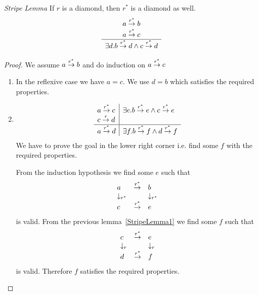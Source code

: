 \begin{lemma}
    \label{StripeLemma2}
    \emph{Stripe Lemma} If $r$ is a diamond, then $r^*$ is a diamond as well.
    $$
    \begin{array}{c} 
        a \stackrel{r^*}{\to} b
        \\
        a \stackrel{r^*}{\to} c
     \\ \hline 
        \exists d. b \stackrel{r^*}{\to} d \land c \stackrel{r^*}{\to} d
    \end{array}
    $$

    \begin{proof}
        We assume $a \stackrel{r^*}{\to} b$ and do induction on $a \stackrel{r^*}{\to} c$

        \begin{enumerate}
        \item In the reflexive case we have $a = c$. We use $d = b$ which
        satisfies the required properties.

        \item
        $$
        \begin{array}{l|l}
            a \stackrel{r^*}{\to} c
            &
            \exists e. b \stackrel{r^*}{\to} e \land c \stackrel{r^*}{\to} e
            \\
            c \stackrel{r}{\to} d
            \\
            \hline
            a \stackrel{r^*}{\to} d
            &
            \exists f. b \stackrel{r^*}{\to} f \land d \stackrel{r^*}{\to} f
        \end{array}
        $$
        We have to prove the goal in the lower right corner i.e. find some $f$
        with the required properties.

        From the induction hypothesis we find some $e$ such that
        $$
        \begin{array}{lll}
            a &\stackrel{r^*}{\to}& b
            \\
            \downarrow_{r^*} & & \downarrow_{r^*}
            \\
            c &\stackrel{r^*}{\to}& e
        \end{array}
        $$
        is valid. From the previous lemma~\ref{StripeLemma1} we find some $f$
        such that
        $$
        \begin{array}{lll}
            c &\stackrel{r^*}{\to}& e
            \\
            \downarrow_{r} & & \downarrow_{r}
            \\
            d &\stackrel{r^*}{\to}& f
        \end{array}
        $$
        is valid. Therefore $f$ satisfies the required properties.
        \end{enumerate}
    \end{proof}
\end{lemma}








